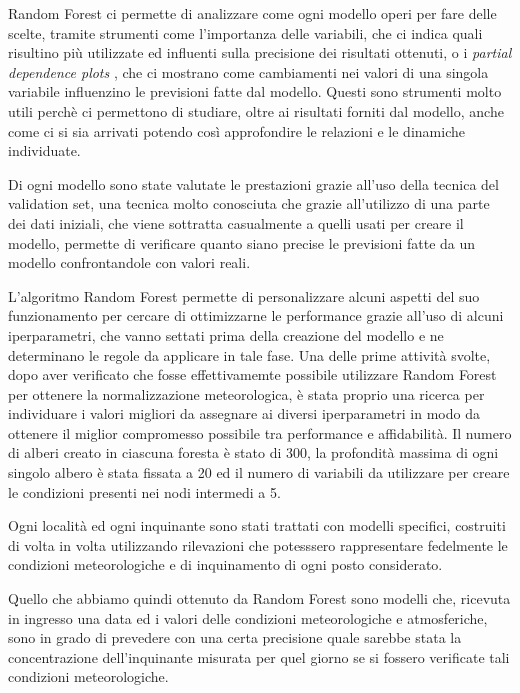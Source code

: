 \documentclass[a4paper,12pt]{report}
\begin{document}
Random Forest ci permette di analizzare come ogni modello operi per fare delle scelte, tramite strumenti come l'importanza delle variabili, che ci indica quali risultino più utilizzate ed influenti sulla precisione dei risultati ottenuti, o i \textit{partial dependence plots}
, che ci mostrano come cambiamenti nei valori di una singola variabile influenzino le previsioni fatte dal modello. Questi sono strumenti molto utili perchè ci permettono di studiare, oltre ai risultati forniti dal modello, anche come ci si sia arrivati potendo così approfondire le relazioni e le dinamiche individuate.

Di ogni modello sono state valutate le prestazioni grazie all'uso della tecnica del validation set, una tecnica molto conosciuta che grazie all'utilizzo di una parte dei dati iniziali, che viene sottratta casualmente a quelli usati per creare il modello, permette di verificare quanto siano precise le previsioni fatte da un modello confrontandole con valori reali.  

L'algoritmo Random Forest permette di personalizzare alcuni aspetti del suo funzionamento per cercare di ottimizzarne le performance grazie all'uso di alcuni iperparametri, che vanno settati prima della creazione del modello e ne determinano le regole da applicare in tale fase. Una delle prime attività svolte, dopo aver verificato che fosse effettivamemte possibile utilizzare Random Forest per ottenere la normalizzazione meteorologica, è stata proprio una ricerca per individuare i valori migliori da assegnare ai diversi iperparametri in modo da ottenere il miglior compromesso possibile tra performance e affidabilità. Il numero di alberi creato in ciascuna foresta è stato di 300, la profondità massima di ogni singolo albero è stata fissata a 20 ed il numero di variabili da utilizzare per creare le condizioni presenti nei nodi intermedi a 5.

Ogni località ed ogni inquinante sono stati trattati con modelli specifici, costruiti di volta in volta utilizzando rilevazioni che potesssero rappresentare fedelmente le condizioni meteorologiche e di inquinamento di ogni posto considerato.  

Quello che abbiamo quindi ottenuto da Random Forest sono modelli che, ricevuta in ingresso una data ed i valori delle condizioni meteorologiche e atmosferiche, sono in grado di prevedere con una certa precisione quale sarebbe stata la concentrazione dell'inquinante misurata per quel giorno se si fossero verificate tali condizioni meteorologiche.  
\end{document}
